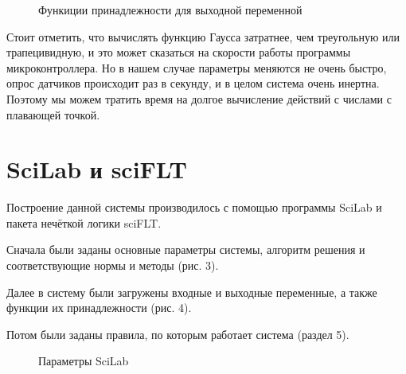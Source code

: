 \documentclass[a4paper]{article}
\begin{document}
\begin{figure}[h]
    \caption{Функиции принадлежности для выходной переменной} 
\end{figure}

Стоит отметить, что вычислять функцию Гаусса затратнее, чем треугольную или
трапецивидную, и это может сказаться на скорости работы программы
микроконтроллера. Но в нашем случае параметры меняются не очень быстро,
опрос датчиков происходит раз в секунду, и в целом система очень инертна.
Поэтому мы можем тратить время на долгое вычисление действий с числами с
плавающей точкой.

\newpage
\section{SciLab и sciFLT}
Построение данной системы производилось с помощью программы SciLab и пакета
нечёткой логики sciFLT.

Сначала были заданы основные параметры системы, алгоритм решения и
соответствующие нормы и методы (рис. 3).

Далее в систему были загружены входные и выходные переменные, а также
функции их принадлежности (рис. 4). 

Потом были заданы правила, по которым работает система (раздел 5).


\begin{figure}[h]
    \caption{Параметры SciLab} 
\end{figure}
\end{document}
